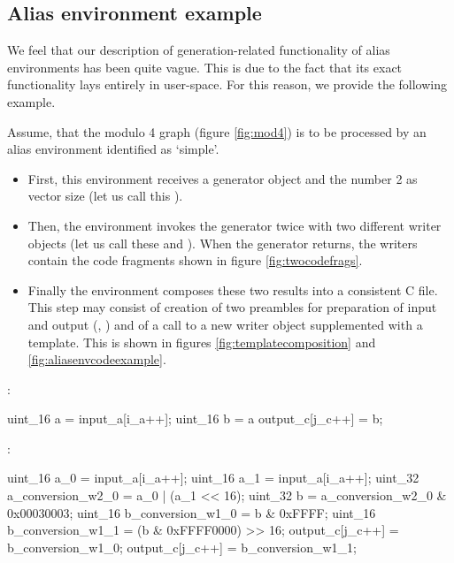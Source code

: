 \subsection*{Alias environment example}

We feel that our description of generation-related functionality of alias environments has been quite vague. This is due to the fact that its exact functionality lays entirely in user-space. For this reason, we provide the following example.

Assume, that the modulo 4 graph (figure \ref{fig:mod4}) is to be processed by an alias environment identified as `simple'. 

\begin{itemize}
  \item First, this environment receives a generator object and the number 2 as vector size (let us call this ).  
  \item Then, the environment invokes the generator twice with two different writer objects (let us call these  and ). When the generator returns, the writers contain the code fragments shown in figure \ref{fig:twocodefrags}.
  \item Finally the environment composes these two results into a consistent C file. This step may consist of creation of two preambles for preparation of input and output (, ) and of a call to a new writer object supplemented with a template. This is shown in figures \ref{fig:templatecomposition} and \ref{fig:aliasenvcodeexample}.
\end{itemize}

\FloatBarrier

  \mybeginfigloose
    :
\begin{code}
uint_16 a = input_a[i_a++];
uint_16 b = a %
output_c[j_c++] = b;
\end{code}
    :
\begin{code}
uint_16 a_0 = input_a[i_a++];
uint_16 a_1 = input_a[i_a++];
uint_32 a_conversion_w2_0 = a_0 | (a_1 << 16);
uint_32 b = a_conversion_w2_0 & 0x00030003;
uint_16 b_conversion_w1_0 = b & 0xFFFF;
uint_16 b_conversion_w1_1 = (b & 0xFFFF0000) >> 16;
output_c[j_c++] = b_conversion_w1_0;
output_c[j_c++] = b_conversion_w1_1;
\end{code}


    \mybeginfigloose
{}

